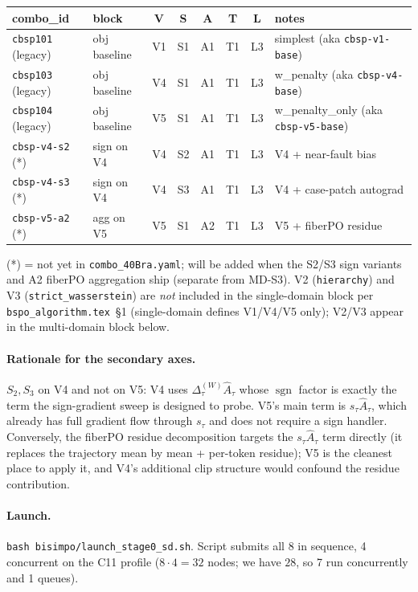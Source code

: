 \documentclass[11pt]{article}
\DeclareMathOperator{\sign}{sgn}
\begin{document}
\begin{center}
\renewcommand{\arraystretch}{1.3}
\begin{tabular}{l l c c c c c l}
\toprule
combo\_id & block & V & S & A & T & L & notes \\
\midrule
\verb|cbsp101| (legacy) & obj baseline   & V1 & S1 & A1 & T1 & L3 & simplest (aka \texttt{cbsp-v1-base}) \\
\verb|cbsp103| (legacy) & obj baseline   & V4 & S1 & A1 & T1 & L3 & w\_penalty (aka \texttt{cbsp-v4-base}) \\
\verb|cbsp104| (legacy) & obj baseline   & V5 & S1 & A1 & T1 & L3 & w\_penalty\_only (aka \texttt{cbsp-v5-base}) \\
\midrule
\verb|cbsp-v4-s2| (*)   & sign on V4     & V4 & S2 & A1 & T1 & L3 & V4 + near-fault bias \\
\verb|cbsp-v4-s3| (*)   & sign on V4     & V4 & S3 & A1 & T1 & L3 & V4 + case-patch autograd \\
\verb|cbsp-v5-a2| (*)   & agg on V5      & V5 & S1 & A2 & T1 & L3 & V5 + fiberPO residue \\
\bottomrule
\end{tabular}
\end{center}

(*) = not yet in \texttt{combo\_40Bra.yaml}; will be added when the S2/S3
sign variants and A2 fiberPO aggregation ship (separate from MD-S3).
V2 (\texttt{hierarchy}) and V3 (\texttt{strict\_wasserstein}) are
\emph{not} included in the single-domain block per
\texttt{bspo\_algorithm.tex}~\S1 (single-domain defines V1/V4/V5 only);
V2/V3 appear in the multi-domain block below.

\paragraph{Rationale for the secondary axes.}
$S_2, S_3$ on V4 and not on V5: V4 uses
$\Delta_\tau^{(W)}\hat A_\tau$ whose $\sign$ factor is exactly the term
the sign-gradient sweep is designed to probe. V5's main term is
$s_\tau\hat A_\tau$, which already has full gradient flow through
$s_\tau$ and does not require a sign handler. Conversely, the fiberPO
residue decomposition targets the $s_\tau\hat A_\tau$ term directly
(it replaces the trajectory mean by mean + per-token residue); V5 is
the cleanest place to apply it, and V4's additional clip structure
would confound the residue contribution.

\paragraph{Launch.}
\verb|bash bisimpo/launch_stage0_sd.sh|. Script submits all 8 in
sequence, 4 concurrent on the C11 profile ($8\cdot 4 = 32$ nodes; we
have $28$, so 7 run concurrently and 1 queues).
\end{document}
